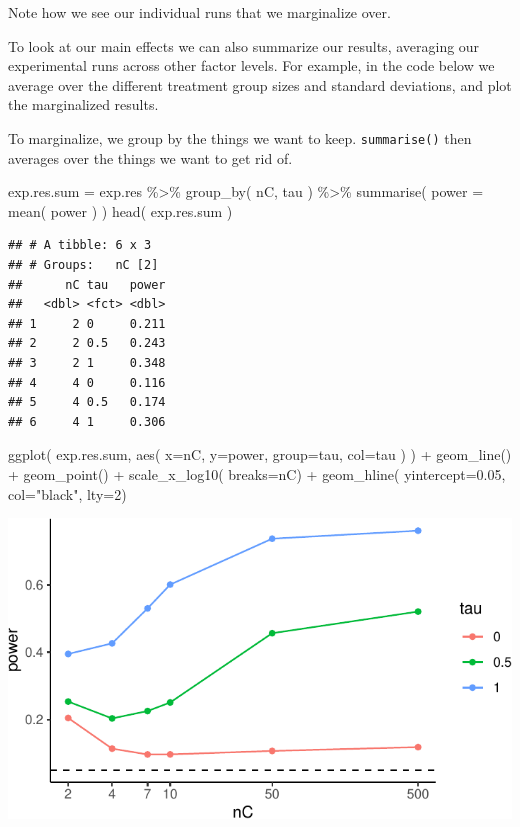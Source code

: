 \documentclass[
]{book}
\newenvironment{Shaded}{\begin{snugshade}}{\end{snugshade}}
\newcommand{\AttributeTok}[1]{\textcolor[rgb]{0.77,0.63,0.00}{#1}}
\newcommand{\DecValTok}[1]{\textcolor[rgb]{0.00,0.00,0.81}{#1}}
\newcommand{\FloatTok}[1]{\textcolor[rgb]{0.00,0.00,0.81}{#1}}
\newcommand{\FunctionTok}[1]{\textcolor[rgb]{0.00,0.00,0.00}{#1}}
\newcommand{\NormalTok}[1]{#1}
\newcommand{\OtherTok}[1]{\textcolor[rgb]{0.56,0.35,0.01}{#1}}
\newcommand{\SpecialCharTok}[1]{\textcolor[rgb]{0.00,0.00,0.00}{#1}}
\newcommand{\StringTok}[1]{\textcolor[rgb]{0.31,0.60,0.02}{#1}}
\begin{document}
Note how we see our individual runs that we marginalize over.

To look at our main effects we can also summarize our results, averaging our
experimental runs across other factor levels. For example, in the code below
we average over the different treatment group sizes and standard deviations,
and plot the marginalized results.

To marginalize, we group by the things we want to keep. \texttt{summarise()} then
averages over the things we want to get rid of.

\begin{Shaded}
\begin{Highlighting}[]
\NormalTok{exp.res.sum }\OtherTok{=}\NormalTok{ exp.res }\SpecialCharTok{\%\textgreater{}\%} \FunctionTok{group\_by}\NormalTok{( nC, tau ) }\SpecialCharTok{\%\textgreater{}\%}
  \FunctionTok{summarise}\NormalTok{( }\AttributeTok{power =} \FunctionTok{mean}\NormalTok{( power ) )}
\FunctionTok{head}\NormalTok{( exp.res.sum )}
\end{Highlighting}
\end{Shaded}

\begin{verbatim}
## # A tibble: 6 x 3
## # Groups:   nC [2]
##      nC tau   power
##   <dbl> <fct> <dbl>
## 1     2 0     0.211
## 2     2 0.5   0.243
## 3     2 1     0.348
## 4     4 0     0.116
## 5     4 0.5   0.174
## 6     4 1     0.306
\end{verbatim}

\begin{Shaded}
\begin{Highlighting}[]
\FunctionTok{ggplot}\NormalTok{( exp.res.sum, }\FunctionTok{aes}\NormalTok{( }\AttributeTok{x=}\NormalTok{nC, }\AttributeTok{y=}\NormalTok{power, }\AttributeTok{group=}\NormalTok{tau, }\AttributeTok{col=}\NormalTok{tau ) ) }\SpecialCharTok{+}
  \FunctionTok{geom\_line}\NormalTok{() }\SpecialCharTok{+} \FunctionTok{geom\_point}\NormalTok{() }\SpecialCharTok{+}
  \FunctionTok{scale\_x\_log10}\NormalTok{( }\AttributeTok{breaks=}\NormalTok{nC) }\SpecialCharTok{+}
  \FunctionTok{geom\_hline}\NormalTok{( }\AttributeTok{yintercept=}\FloatTok{0.05}\NormalTok{, }\AttributeTok{col=}\StringTok{"black"}\NormalTok{, }\AttributeTok{lty=}\DecValTok{2}\NormalTok{)}
\end{Highlighting}
\end{Shaded}

\begin{center}\includegraphics[width=0.75\linewidth]{Designing-Simulations-in-R_files/figure-latex/plotCollapse-1} \end{center}
\end{document}
